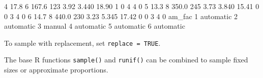 \documentclass[
]{book}
\newenvironment{Shaded}{\begin{snugshade}}{\end{snugshade}}
\newcommand{\DecValTok}[1]{\textcolor[rgb]{0.00,0.00,0.81}{#1}}
\newcommand{\FloatTok}[1]{\textcolor[rgb]{0.00,0.00,0.81}{#1}}
\newcommand{\NormalTok}[1]{#1}
\begin{document}
\begin{Shaded}
\begin{Highlighting}[]
\DecValTok{4} \FloatTok{17.8}         \DecValTok{6} \FloatTok{167.6} \DecValTok{123}       \FloatTok{3.92}  \FloatTok{3.440} \FloatTok{18.90}      \DecValTok{1}  \DecValTok{0}    \DecValTok{4}    \DecValTok{4}     \DecValTok{0}
\DecValTok{5} \FloatTok{13.3}         \DecValTok{8} \FloatTok{350.0} \DecValTok{245}       \FloatTok{3.73}  \FloatTok{3.840} \FloatTok{15.41}      \DecValTok{0}  \DecValTok{0}    \DecValTok{3}    \DecValTok{4}     \DecValTok{0}
\DecValTok{6} \FloatTok{14.7}         \DecValTok{8} \FloatTok{440.0} \DecValTok{230}       \FloatTok{3.23}  \FloatTok{5.345} \FloatTok{17.42}      \DecValTok{0}  \DecValTok{0}    \DecValTok{3}    \DecValTok{4}     \DecValTok{0}
\NormalTok{     am\_fac}
\DecValTok{1}\NormalTok{ automatic}
\DecValTok{2}\NormalTok{ automatic}
\DecValTok{3}\NormalTok{    manual}
\DecValTok{4}\NormalTok{ automatic}
\DecValTok{5}\NormalTok{ automatic}
\DecValTok{6}\NormalTok{ automatic}
\end{Highlighting}
\end{Shaded}

To sample with replacement, set \texttt{replace\ =\ TRUE}.

The base R functions \texttt{sample()} and \texttt{runif()} can be combined to sample fixed sizes or approximate proportions.
\end{document}
